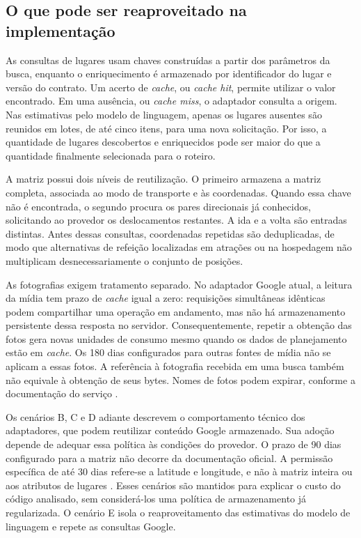 \subsection{O que pode ser reaproveitado na implementação}

As consultas de lugares usam chaves construídas a partir dos parâmetros da busca, enquanto o enriquecimento é armazenado por identificador do lugar e versão do contrato. Um acerto de \textit{cache}, ou \textit{cache hit}, permite utilizar o valor encontrado. Em uma ausência, ou \textit{cache miss}, o adaptador consulta a origem. Nas estimativas pelo modelo de linguagem, apenas os lugares ausentes são reunidos em lotes, de até cinco itens, para uma nova solicitação. Por isso, a quantidade de lugares descobertos e enriquecidos pode ser maior do que a quantidade finalmente selecionada para o roteiro.

A matriz possui dois níveis de reutilização. O primeiro armazena a matriz completa, associada ao modo de transporte e às coordenadas. Quando essa chave não é encontrada, o segundo procura os pares direcionais já conhecidos, solicitando ao provedor os deslocamentos restantes. A ida e a volta são entradas distintas. Antes dessas consultas, coordenadas repetidas são deduplicadas, de modo que alternativas de refeição localizadas em atrações ou na hospedagem não multiplicam desnecessariamente o conjunto de posições.

As fotografias exigem tratamento separado. No adaptador Google atual, a leitura da mídia tem prazo de \textit{cache} igual a zero: requisições simultâneas idênticas podem compartilhar uma operação em andamento, mas não há armazenamento persistente dessa resposta no servidor. Consequentemente, repetir a obtenção das fotos gera novas unidades de consumo mesmo quando os dados de planejamento estão em \textit{cache}. Os 180 dias configurados para outras fontes de mídia não se aplicam a essas fotos. A referência à fotografia recebida em uma busca também não equivale à obtenção de seus bytes. Nomes de fotos podem expirar, conforme a documentação do serviço \cite{google_places_fotos2026}.

Os cenários B, C e D adiante descrevem o comportamento técnico dos adaptadores, que podem reutilizar conteúdo Google armazenado. Sua adoção depende de adequar essa política às condições do provedor. O prazo de 90 dias configurado para a matriz não decorre da documentação oficial. A permissão específica de até 30 dias refere-se a latitude e longitude, e não à matriz inteira ou aos atributos de lugares \cite{google_maps_termos2026,google_places_politicas2026}. Esses cenários são mantidos para explicar o custo do código analisado, sem considerá-los uma política de armazenamento já regularizada. O cenário E isola o reaproveitamento das estimativas do modelo de linguagem e repete as consultas Google.

